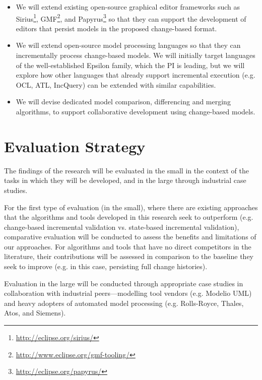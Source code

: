 \documentclass{llncs}
\begin{document}
\begin{itemize}
\item We will extend existing open-source graphical editor frameworks such as Sirius\footnote{\url{http://eclipse.org/sirius/}}, GMF\footnote{\url{http://www.eclipse.org/gmf-tooling/}}, and Papyrus\footnote{\url{http://eclipse.org/papyrus/}} so that they can support the development of editors that persist models in the proposed change-based format.
\item We will extend open-source model processing languages so that they can incrementally process change-based models. We will initially target languages of the well-established Epsilon family, which the PI is leading, but we will explore how other languages that already support incremental execution (e.g. OCL, ATL, IncQuery) can be extended with similar capabilities.
\item We will devise dedicated model comparison, differencing and merging algorithms, to support collaborative development using change-based models.
\end{itemize}

\section{Evaluation Strategy}
\label{Evaluation Strategy}
The findings of the research will be evaluated in the small in the context of the tasks in which they will be developed, and in the large through industrial case studies.

For the first type of evaluation (in the small), where there are existing approaches that the algorithms and tools developed in this research seek to outperform (e.g. change-based incremental validation vs. state-based incremental validation), comparative evaluation will be conducted to assess the benefits and limitations of our approaches. For algorithms and tools that have no direct competitors in the literature, their contributions will be assessed in comparison to the baseline they seek to improve (e.g. in this case, persisting full change histories).

Evaluation in the large will be conducted through appropriate case studies in collaboration with industrial peers---modelling tool vendors (e.g. Modelio UML) and heavy adopters of automated model processing (e.g. Rolls-Royce, Thales, Atos, and Siemens).
\end{document}
